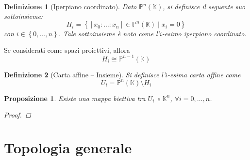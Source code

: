 \documentclass[12pt]{scrartcl}
\theoremstyle{style}
\newtheorem{definizione}{Definizione}[section]
\newtheorem{prop}{Proposizione}[section]
\numberwithin{equation}{subsection}
\begin{document}
\begin{definizione}
	[Iperpiano coordinato]
	Dato $\mathbb{P}^n(\mathbb{K})$, si definisce il seguente suo sottoinsieme:
	\[
		H_i = \left\{ [x_0 : \ldots :x_n] \in \mathbb{P}^n(\mathbb{K})  \mid x_i =0  \right\} 
	\] 
	con $i \in \left\{ 0,\ldots,n \right\} $. Tale sottoinsieme \`e noto come l'$i$-esimo \textit{iperpiano coordinato}.
\end{definizione}
\noindent Se considerati come spazi proiettivi, allora
\begin{equation}
	H_i \cong \mathbb{P}^{n-1} (\mathbb{K})
\end{equation}
\begin{definizione}
	[Carta affine -- Insieme]
	Si definisce l'$i$-esima \textit{carta affine} come 
	\[
	U_i = \mathbb{P}^n (\mathbb{K}) \setminus H_i
	\] 
\end{definizione}
\begin{prop}
	Esiste una mappa biettiva tra $U_i$ e $\mathbb{K}^n$, $\forall i=0,\ldots,n$.
	\begin{proof}
	\end{proof}
\end{prop}




















\newpage
\section{Topologia generale}
\end{document}
